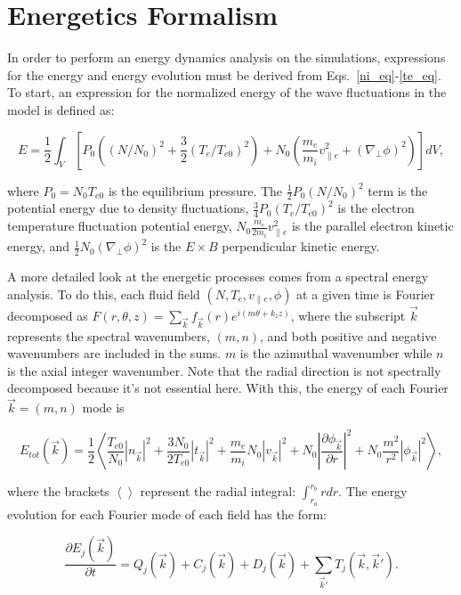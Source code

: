 \documentclass[showpacs,preprintnumbers,amsmath,amssymb,superscriptaddress,aip]{revtex4-1}
\def\beq{\begin{equation}}
\def\eeq{\end{equation}}
\newcommand{\pdiff}[2]{\frac{\partial#1}{\partial#2}}
\def\grad{\nabla}
\newcommand{\gradperp}{\grad_\perp}
\newcommand{\vpe}{v_{\parallel e}}
\begin{document}
\section{Energetics Formalism}
\label{sec_energetics_machinery}

In order to perform an energy dynamics analysis on the simulations, expressions for the energy and energy evolution must be derived from Eqs.~\ref{ni_eq}-\ref{te_eq}.
To start, an expression for the normalized energy of the wave fluctuations in the model is defined as:

\beq
\label{energy_eq}
E = \frac{1}{2} \int_V  \left[ P_0 \left((N/N_0)^2 + \frac{3}{2} (T_e/T_{e0})^2 \right) + N_0 \left( \frac{m_e}{m_i} \vpe^2 + (\gradperp \phi)^2 \right) \right] dV,
\eeq

where $P_0 = N_0 T_{e0}$ is the equilibrium pressure.
The $\frac{1}{2} P_0 (N/N_0)^2$ term is the potential energy due to density fluctuations, $\frac{3}{4} P_0 (T_e/T_{e0})^2$ is the electron temperature fluctuation potential energy,
$N_0 \frac{m_e}{2 m_i} \vpe^2$ is the parallel electron kinetic energy, and $\frac{1}{2} N_0 (\gradperp \phi)^2$ is the $E \times B$ perpendicular kinetic energy.

A more detailed look at the energetic processes comes from a spectral energy analysis. To do this, each fluid field $(N,T_e,\vpe,\phi)$ at a given time is Fourier decomposed as 
$F(r,\theta,z) = \sum_{\vec{k}} f_{\vec{k}}(r) e^{i (m \theta + k_z z )}$,
where the subscript $\vec{k}$ represents the spectral wavenumbers, $(m,n)$, and both positive and negative wavenumbers are included in the sums. 
$m$ is the azimuthal wavenumber while $n$ is the axial integer wavenumber. 
Note that the radial direction is not spectrally decomposed because it's not essential here.
With this, the energy of each Fourier $\vec{k} = (m,n)$ mode is

\beq
\label{E_k}
E_{tot}(\vec{k}) = \frac{1}{2} \left< \frac{T_{e0}}{N_0} |n_{\vec{k}}|^2 + \frac{3 N_0}{2 T_{e0}} |t_{\vec{k}}|^2 + \frac{m_e}{m_i} N_0 |v_{\vec{k}}|^2 + N_0 \left| \pdiff{\phi_{\vec{k}}}{r} \right|^2 + N_0 \frac{m^2}{r^2} |\phi_{\vec{k}}|^2 \right>,
\eeq

where the brackets $\left< \right>$ represent the radial integral: $\int_{r_a}^{r_b} r dr$. 
The energy evolution for each Fourier mode of each field has the form:

\beq
\label{dEdt_j}
\pdiff{E_{j}(\vec{k})}{t} = Q_{j}(\vec{k}) + C_{j}(\vec{k}) + D_j(\vec{k}) + \sum_{\vec{k}'} T_{j}(\vec{k},\vec{k}').
\eeq
\end{document}
